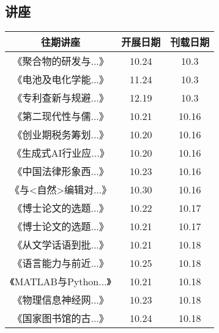 \documentclass[letterpaper, 12pt]{article}
\begin{document}
\begin{multicols}{2}

\section{讲座}
\begin{tabular}{|c|c|c|}
    往期讲座 & 开展日期 & 刊载日期\\
    \hline
    《聚合物的研发与...》 & 10.24 & 10.3\\
    《电池及电化学能...》 & 11.24 & 10.3\\
    《专利查新与规避...》 & 12.19 & 10.3\\
    《第二现代性与儒...》& 10.21 &10.16\\
    《创业期税务筹划...》 & 10.20 & 10.16\\
    《生成式AI行业应...》 & 10.20 & 10.16\\
    《中国法律形象西...》 & 10.23 & 10.16\\
    《与<自然>编辑对...》 & 10.30 & 10.16\\
    《博士论文的选题...》 & 10.22 & 10.17\\
    《博士论文的选题...》 & 10.21 & 10.17\\
    《从文学话语到批...》 & 10.21 & 10.18\\
    《语言能力与前近...》 & 10.25 & 10.18\\
    《MATLAB与Python...》 & 10.21 & 10.18\\
    《物理信息神经网...》 & 10.23 & 10.18\\
    《国家图书馆的古...》 & 10.24 & 10.18\\
    \hline\hline

    
    \hline
\end{tabular}


\end{multicols}
\end{document}
